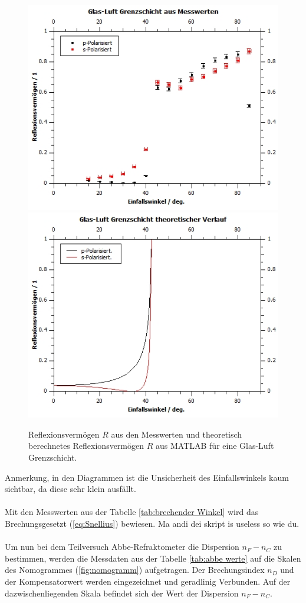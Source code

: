 \documentclass[12pt,a4paper,twoside]{article}
\begin{document}
\begin{figure}[H]
    \centering
    \includegraphics[width=0.6\linewidth]{nudes/GL Mess.jpg}
    \includegraphics[width=0.6\linewidth]{nudes/GL theor.jpg}
    \caption{Reflexionsvermögen $R$ aus den Messwerten und theoretisch berechnetes Reflexionsvermögen $R$ aus MATLAB für eine Glas-Luft Grenzschicht. }
    \label{fig:reflexionsvermögen GL}
\end{figure}

\noindent
Anmerkung, in den Diagrammen ist die Unsicherheit des Einfallswinkels kaum sichtbar, da diese sehr klein ausfällt. 
\\
\\
Mit den Messwerten aus der Tabelle \ref{tab:brechender Winkel} wird das Brechungsgesetzt (\ref{eq:Snellius}) bewiesen. 
Ma andi dei skript is useless so wie du. 
\\
\\
Um nun bei dem Teilversuch Abbe-Refraktometer die Dispersion $n_F-n_C$ zu bestimmen, werden die Messdaten aus der Tabelle \ref{tab:abbe werte} auf die Skalen des Nomogrammes (\ref{fig:nomogramm}) aufgetragen. 
Der Brechungsindex $n_D$ und der Kompensatorwert werden eingezeichnet und geradlinig Verbunden. 
Auf der dazwischenliegenden Skala befindet sich der Wert der Dispersion $n_F-n_C$. 
\end{document}
